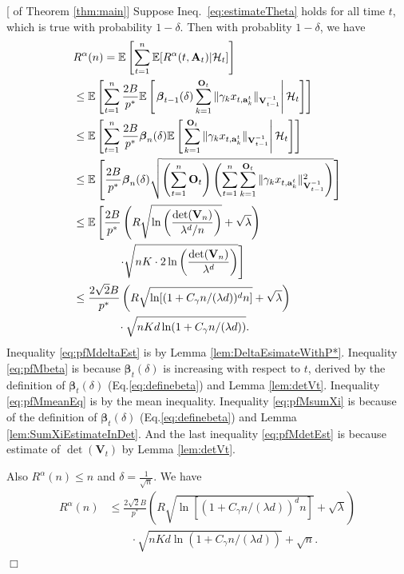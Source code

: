 \documentclass{article}
\newcommand{\bbeta}{\boldsymbol{\beta}}
\newcommand{\EE}{\mathbb{E}}
\newcommand{\bA}{\mathbf{A}}
\newcommand{\ba}{\mathbf{a}}
\newcommand{\bO}{\mathbf{O}}
\newcommand{\bV}{\mathbf{V}}
\newcommand{\cH}{\mathcal{H}}
\newcommand{\norm}[1]{\| #1 \|}
\newenvironment{proof}{\noindent {\textbf{Proof. }}}{$\Box$ \medskip}
\begin{document}
\begin{proof}[ of Theorem \ref{thm:main}]
	Suppose Ineq.~\eqref{eq:estimateTheta} holds for all time $t$, which is true with probability $1-\delta$. Then with probablity $1-\delta$, we have
	\begin{align}
	&R^{\alpha}(n) = \EE \left[\sum_{t=1}^{n} \EE[R^{\alpha}(t, \bA_t) | \cH_t] \right] \notag\\
	&\leq \EE\left[\sum_{t=1}^{n} \frac{2B}{p^*} \EE \left[ \left. \bbeta_{t-1}(\delta) \sum_{k=1}^{\bO_t}\norm{\gamma_k x_{t,\ba_k^t}}_{\bV_{t-1}^{-1}}\right| \cH_t \right] \right] \label{eq:pfMdeltaEst}\\
	&\leq \EE\left[\sum_{t=1}^{n} \frac{2B}{p^*} \bbeta_{n}(\delta) \EE \left[ \left. \sum_{k=1}^{\bO_t}\norm{\gamma_k x_{t,\ba_k^t}}_{\bV_{t-1}^{-1}} \right| \cH_t \right] \right] \label{eq:pfMbeta}\\
	&\leq \EE \left[\frac{2B}{p^*} \bbeta_n(\delta) \sqrt{\left(\sum_{t=1}^{n} \bO_t\right) \left( \sum_{t=1}^{n} \sum_{k=1}^{\bO_t}\norm{\gamma_k x_{t,\ba_k^t}}_{\bV_{t-1}^{-1}}^2 \right)} \right ]  \label{eq:pfMmeanEq}\\
	&\leq \EE\left[\frac{2B}{p^*} \left( R \sqrt{ \ln \left( \frac{\det(\bV_n)}{\lambda^d / n} \right)} + \sqrt{\lambda} \right) \right. \notag\\
	& \left. \qquad \qquad \cdot \sqrt{nK \cdot 2\ln \left(\frac{\det(\bV_n)}{\lambda^d} \right)} \right] \label{eq:pfMsumXi}\\
	&\leq \frac{2\sqrt{2}B}{p^*} \left(R\sqrt{ \ln[ (1 + C_\gamma n/(\lambda d))^d n ]} + \sqrt{\lambda} \right) \notag\\
	&\qquad \qquad \cdot \sqrt{nKd\ln(1 + C_\gamma n/(\lambda d))}. \label{eq:pfMdetEst}
	\end{align}
	Inequality \eqref{eq:pfMdeltaEst} is by Lemma \ref{lem:DeltaEsimateWithP*}. 
	Inequality \eqref{eq:pfMbeta} is because $\bbeta_{t}(\delta)$ is increasing with respect to $t$, derived by the definition of $\bbeta_t(\delta)$ (Eq.\eqref{eq:definebeta}) and Lemma \ref{lem:detVt}. 
	Inequality \eqref{eq:pfMmeanEq} is by the mean inequality. 
	Inequality \eqref{eq:pfMsumXi} is because of the definition of $\bbeta_t(\delta)$ (Eq.\eqref{eq:definebeta}) and Lemma \ref{lem:SumXiEstimateInDet}. 
	And the last inequality \eqref{eq:pfMdetEst} is because estimate of $\det(\bV_t)$ by Lemma \ref{lem:detVt}.
	
	Also $R^{\alpha}(n) \leq n$ and $\delta = \frac{1}{\sqrt{n}}$. We have 
	\begin{align*}
		R^{\alpha}(n) &\leq \frac{2\sqrt{2}B}{p^*} \left(R\sqrt{ \ln[ (1 + C_\gamma n/(\lambda d))^d n ]} + \sqrt{\lambda} \right) \\
		&\qquad \cdot \sqrt{nKd\ln(1 + C_\gamma n/(\lambda d))} + \sqrt{n}.
	\end{align*}
\end{proof}
\end{document}
